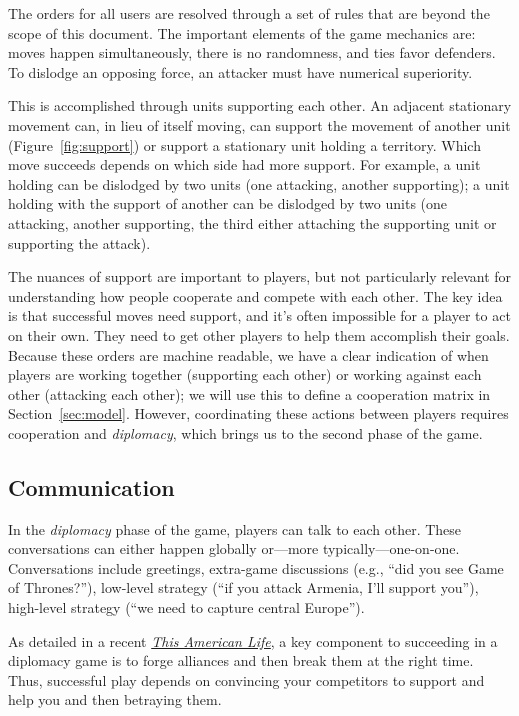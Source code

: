 \documentclass[11pt,letterpaper]{article}
\begin{document}
The orders for all users are resolved through a set of rules that are
beyond the scope of this document.  The important elements of the game
mechanics are: moves happen simultaneously, there is no randomness,
and ties favor defenders.  To dislodge an opposing force, an attacker
must have numerical superiority.

This is accomplished through units supporting each other.  An adjacent
stationary movement can, in lieu of itself moving, can support the
movement of another unit (Figure~\ref{fig:support}) or support a
stationary unit holding a territory.  Which move succeeds depends on
which side had more support.  For example, a unit holding can be
dislodged by two units (one attacking, another supporting); a unit
holding with the support of another can be dislodged by two units (one
attacking, another supporting, the third either attaching the
supporting unit or supporting the attack).

The nuances of support are important to players, but not particularly
relevant for understanding how people cooperate and compete with each
other.  The key idea is that successful moves need support, and it's
often impossible for a player to act on their own.  They need to get
other players to help them accomplish their goals.  Because these
orders are machine readable, we have a clear indication of when
players are working together (supporting each other) or working
against each other (attacking each other); we will use this to define
a cooperation matrix in Section~\ref{sec:model}.  However,
coordinating these actions between players requires cooperation and
\emph{diplomacy}, which brings us to the second phase of the game.

\subsection{Communication}

In the \emph{diplomacy} phase of the game, players can talk to each
other.  These conversations can either happen globally or---more
typically---one-on-one.  Conversations include greetings, extra-game
discussions (e.g., ``did you see Game of Thrones?''), low-level
strategy (``if you attack Armenia, I'll support you''), high-level
strategy (``we need to capture central Europe'').

As detailed in a recent
\href{http://www.thisamericanlife.org/radio-archives/episode/531/got-your-back?act=1}{\emph{This
    American Life}}, a key component to succeeding in a diplomacy game
is to forge alliances and then break them at the right time.  Thus,
successful play depends on convincing your competitors to support and
help you and then betraying them.
\end{document}
